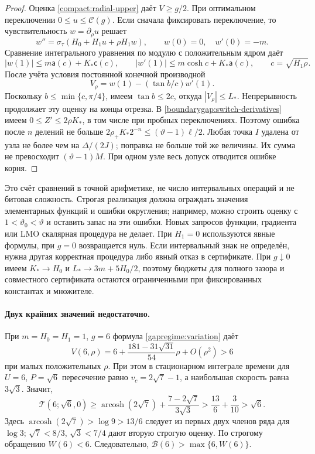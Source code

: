\begin{proof}
Оценка \eqref{compact:radial-upper} даёт $V\ge g/2$.
При оптимальном переключении $0\le u\le\mathcal C(g)$.
Если сначала фиксировать переключение, то чувствительность
$w=\partial_\rho u$ решает
\[
 w''=\sigma_\tau(H_0+H_1u+\rho H_1w),\qquad
 w(0)=0,\quad w'(0)=-m.
\]
Сравнение интегрального уравнения по модулю с положительным ядром даёт
\[
 |w(1)|\le m\mathsf a(c)+K_*\mathsf c(c),\qquad
 |w'(1)|\le m\cosh c+K_*\mathsf a(c),\qquad c=\sqrt{H_1\rho}.
\]
После учёта условия постоянной конечной производной
\begin{equation}\label{boundarygap:rho-derivative}
 V_\rho=w(1)-(\tan b/c)w'(1).
\end{equation}
Поскольку $b\le\min\{c,\pi/4\}$, имеем $\tan b\le2c$,
откуда $|V_\rho|\le L_*$.
Непрерывность продолжает эту оценку на концы отрезка.
В \eqref{boundarygap:switch-derivatives} имеем
$0\le Z'\le2\rho K_*$, в том числе при пробных переключениях.
Поэтому ошибка после $n$ делений не больше
$2\rho_+K_*2^{-n}\le(\vartheta-1)\ell/2$.
Любая точка $I$ удалена от узла не более чем на $\Delta/(2J)$;
поправка не больше той же величины.
Их сумма не превосходит $(\vartheta-1)M$.
При одном узле весь допуск отводится ошибке корня.
\end{proof}

Это счёт сравнений в точной арифметике, не число интервальных
операций и не битовая сложность. Строгая реализация должна
ограждать значения элементарных функций и ошибки округления;
например, можно строить оценку с $1<\vartheta_0<\vartheta$
и оставить запас на эти ошибки. Новых запросов функции,
градиента или LMO скалярная процедура не делает.
При $H_1=0$ используются явные формулы, при $g=0$ возвращается нуль.
Если интервальный знак не определён, нужна другая корректная
процедура либо явный отказ в сертификате.
При $g\downarrow0$ имеем $K_*\to H_0$ и
$L_*\to3m+5H_0/2$, поэтому бюджеты для полного зазора и
совместного сертификата остаются ограниченными при фиксированных
константах и множителе.

\paragraph{Двух крайних значений недостаточно.}
\label{boundarygap:counterexample}
При $m=H_0=H_1=1$, $g=6$ формула
\eqref{gapregime:variation} даёт
\begin{equation}\label{boundarygap:small-radius}
 V(6,\rho)=6+\frac{181-31\sqrt{31}}{54}\rho+O(\rho^2)>6
\end{equation}
при малых положительных $\rho$.
При этом в стационарном интеграле времени для $U=6$, $P=\sqrt6$
пересечение равно $v_c=2\sqrt7-1$, а наибольшая скорость равна
$3\sqrt3$. Значит,
\[
 \mathcal T(6;\sqrt6,0)
 \ge\operatorname{arcosh}(2\sqrt7)
       +\frac{7-2\sqrt7}{3\sqrt3}
 >\frac{13}{6}+\frac3{10}>\sqrt6.
\]
Здесь $\operatorname{arcosh}(2\sqrt7)>\log9>13/6$
следует из первых двух членов ряда для $\log3$;
$\sqrt7<8/3$, $\sqrt3<7/4$ дают вторую строгую оценку.
По строгому обращению $W(6)<6$.
Следовательно, $\mathcal B(6)>\max\{6,W(6)\}$.
